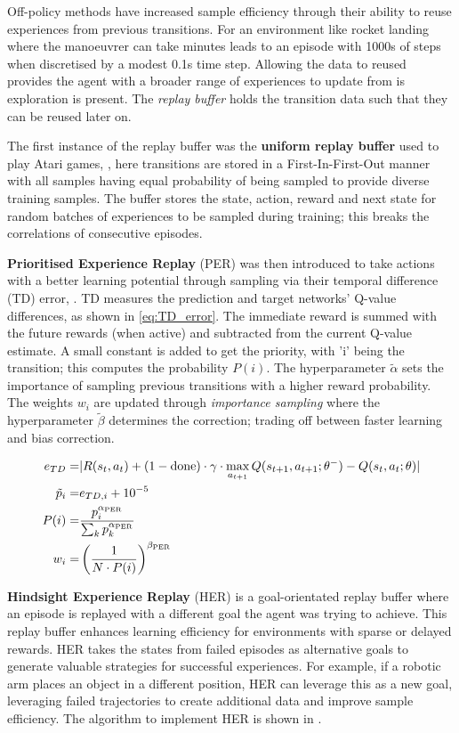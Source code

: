 Off-policy methods have increased sample efficiency through their ability to reuse experiences from previous transitions. For an environment like rocket landing where the manoeuvrer can take minutes leads to an episode with 1000s of steps when discretised by a modest 0.1s time step. Allowing the data to reused provides the agent with a broader range of experiences to update from is exploration is present. The \textit{replay buffer} holds the transition data such that they can be reused later on.

The first instance of the replay buffer was the \textbf{uniform replay buffer} used to play Atari games, \cite{mnih2013playing}, here transitions are stored in a First-In-First-Out manner with all samples having equal probability of being sampled to provide diverse training samples. The buffer stores the state, action, reward and next state for random batches of experiences to be sampled during training; this breaks the correlations of consecutive episodes.

\textbf{Prioritised Experience Replay} (PER) was then introduced to take actions with a better learning potential through sampling via their temporal difference (TD) error, \cite{schaul2015prioritized}. TD measures the prediction and target networks' Q-value differences, as shown in \autoref{eq:TD_error}. The immediate reward is summed with the future rewards (when active) and subtracted from the current Q-value estimate. A small constant is added to get the priority, with 'i' being the transition; this computes the probability $P(i)$. The hyperparameter $\tilde{\alpha}$ sets the importance of sampling previous transitions with a higher reward probability. The weights \(w_i\) are updated through \textit{importance sampling} where the hyperparameter $\tilde{\beta}$ determines the correction; trading off between faster learning and bias correction. 

\begin{equation}
\begin{aligned}
    e_{TD} =& |R(s_t, a_t) + (1 - \text{done}) \cdot \gamma \cdot \max_{a_{t+1}} Q(s_{t+1}, a_{t+1}; \theta^-) - Q(s_t, a_t; \theta)| \\
    \Tilde{p}_i =& e_{TD,i} + 10^{-5} \\
    P(i) =& \frac{p_i^{\alpha_{\text{PER}}}}{\sum_k p_k^{\alpha_{\text{PER}}}} \\
    w_i =& \left( \frac{1}{N \cdot P(i)} \right)^{\beta_{\text{PER}}}
\label{eq:TD_error}
\end{aligned}
\end{equation}

\textbf{Hindsight Experience Replay} (HER) is a goal-orientated replay buffer where an episode is replayed with a different goal the agent was trying to achieve. This replay buffer enhances learning efficiency for environments with sparse or delayed rewards. HER takes the states from failed episodes as alternative goals to generate valuable strategies for successful experiences. For example, if a robotic arm places an object in a different position, HER can leverage this as a new goal, leveraging failed trajectories to create additional data and improve sample efficiency. The algorithm to implement HER is shown in \cite{andrychowicz2017hindsight}.